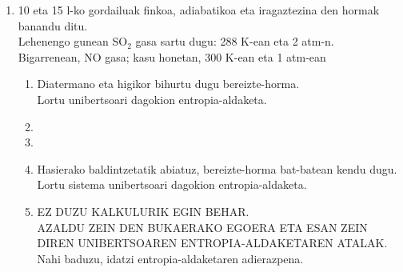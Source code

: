 \documentclass[10pt]{article}              %
\begin{document}
\begin{enumerate}
%    
%    
%    
%    



\item 10 eta 15 l-ko gordailuak finkoa, adiabatikoa eta iragaztezina den hormak banandu ditu. \\Lehenengo gunean SO$_{2}$ gasa sartu dugu: 288 K-ean eta 2 atm-n. \\Bigarrenean, NO gasa; kasu honetan, 300 K-ean eta 1 atm-ean\\
    
    
\begin{enumerate} 
\item Diatermano eta higikor bihurtu dugu bereizte-horma.\\
Lortu unibertsoari dagokion entropia-aldaketa.
\item[]
\item[]
\item Hasierako baldintzetatik abiatuz, bereizte-horma bat-batean kendu dugu.\\
Lortu sistema unibertsoari dagokion entropia-aldaketa.
\item [] EZ DUZU KALKULURIK EGIN BEHAR.\\
AZALDU ZEIN DEN BUKAERAKO EGOERA ETA ESAN ZEIN DIREN UNIBERTSOAREN ENTROPIA-ALDAKETAREN ATALAK.\\
Nahi baduzu, idatzi entropia-aldaketaren adierazpena.\\



\end{enumerate}
\end{enumerate}
\end{document}
